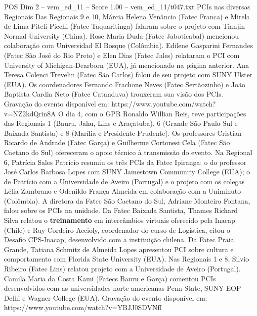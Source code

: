 \begin{textsample}{POS Dim 2 – vem\_ed\_11 – Score 1.00 – vem\_ed\_11/t047.txt}  \label{ex:f2_pos_157}
PCIs nas diversas Regionais Das Regionais 9 e 10, Márcia Helena Venâncio (Fatec Franca) e Mirela de Lima Piteli Picchi (Fatec Taquaritinga) falaram sobre o projeto com Tianjin Normal University (China).
Rose Maria Duda (Fatec Jaboticabal) mencionou colaboração com Universidad El Bosque (Colômbia).
Edilene Gasparini Fernandes (Fatec São José do Rio Preto) e Elen Dias (Fatec Jales) relataram o PCI com University of Michigan-Dearborn (EUA), já mencionado na página anterior.
Ana Teresa Colenci Trevelin (Fatec São Carlos) falou de seu projeto com SUNY Ulster (EUA).
Os coordenadores Fernando Frachone Neves (Fatec Sertãozinho) e João Baptista Cardia Neto (Fatec Catanduva) trouxeram sua visão dos PCIs.
Gravação do evento disponível em: https://www.youtube.com/watch?v=NZ2kdQrin8A O dia 4, com o GPR Ronaldo Willian Reis, teve participações das Regionais 1 (Bauru, Jahu, Lins e Araçatuba), 6 (Grande São Paulo Sul e Baixada Santista) e 8 (Marília e Presidente Prudente).
Os professores Cristian Ricardo de Andrade (Fatec Garça) e Guilherme Cortonesi Cela (Fatec São Caetano do Sul) ofereceram o apoio técnico à transmissão do evento.
Na Regional 6, Patrícia Sales Patrício resumiu os três PCIs da Fatec Ipiranga: o do professor José Carlos Barbosa Lopes com SUNY Jamestown Community College (EUA); o de Patrício com a Universidade de Aveiro (Portugal) e o projeto com os colegas Lélia Zambrano e Odenildo França Almeida em colaboração com a Uniminuto (Colômbia).
A diretora da Fatec São Caetano do Sul, Adriane Monteiro Fontana, falou sobre os PCIs na unidade.
Da Fatec Baixada Santista, Thames Richard Silva relatou o \textbf{treinamento} em intercâmbios virtuais oferecido pela Inacap (Chile) e Ruy Cordeiro Accioly, coordenador do curso de Logística, citou o Desafio CPS-Inacap, desenvolvido com a instituição chilena.
Da Fatec Praia Grande, Tatiana Schmitz de Almeida Lopes apresentou PCI sobre cultura e comportamento com Florida State University (EUA).
Nas Regionais 1 e 8, Silvio Ribeiro (Fatec Lins) relatou projeto com a Universidade de Aveiro (Portugal).
Camila Maria da Costa Kami (Fatecs Bauru e Garça) comentou PCIs desenvolvidos com as universidades norte-americanas Penn State, SUNY EOP Delhi e Wagner College (EUA).
Gravação do evento disponível em: https://www.youtube.com/watch?v=YBJJ0SDVNfI

\end{textsample}
